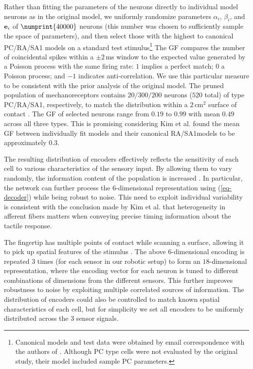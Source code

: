 Rather than fitting the parameters of the neurons directly to individual model neurons  as in the original model, we uniformly randomize parameters $\alpha_i$, $\beta_i$, and $\mathbf{e}_i$ of $\numprint{40000}$ neurons (this number was chosen to sufficiently sample the space of parameters), and then select those with the highest \gammafactor{} \cite{jolivet2008benchmark} to canonical PC/RA/SA1 models on a standard test stimulus\footnote{Canonical models and test data were obtained by email correspondence with the authors of \cite{kim2011does}. Although PC type cells were not evaluated by the original study, their model included sample PC parameters.}
The GF compares the number of coincidental spikes within a $\pm 2$\,ms window to the expected value generated by a Poisson process with the same firing rate: $1$ implies a perfect match; $0$ a Poisson process; and $-1$ indicates anti-correlation. We use this particular measure to be consistent with the  prior analysis of the original model. %
The pruned population of mechanoreceptors contains $20/300/200$ neurons ($520$ total)  of type PC/RA/SA1, respectively, to match the distribution within a $2$\,cm$^2$ %
surface of contact \cite{johansson2009coding}. %
The GF of selected neurons range from $0.19$ to $0.99$  with mean $0.49$ across all three types. This is promising considering Kim et al. \cite{kim2011does} found the mean GF between individually fit models and their canonical RA/SA1models to be approximately $0.3$.

The resulting distribution of encoders effectively reflects the sensitivity of each cell to various characteristics of the sensory input. By allowing them to vary randomly, the information content of the population is increased \cite{hunsberger2014}. In particular, the network can further process the $6$-dimensional representation using (\ref{eq-decoder})  while being robust to noise.
This need to exploit individual variability is consistent with the conclusion made by Kim et al. \cite{kim2011does} that heterogeneity in afferent fibers matters when conveying precise timing information about the tactile response.

The fingertip has multiple points of contact while scanning a surface, allowing it to pick up spatial features of the stimulus \cite{weber2013spatial}. The above $6$-dimensional encoding is repeated 3 times (for each sensor in our robotic setup)  to form an $18$-dimensional representation, where the encoding vector for each neuron is tuned to different combinations of dimensions from the different sensors. This further improves robustness to noise by exploiting multiple correlated sources of information. %
The distribution of encoders could also be controlled to match known spatial characteristics of each cell, but for simplicity we set all encoders to be uniformly distributed across the 3 sensor signals.

